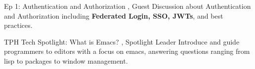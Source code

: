 

\begin{cventries}


  \cventrynoposition
    {Ep 1: Authentication and Authorization} %
    {, Guest}
    {}
    {Discussion about Authentication and Authorization including \textbf{Federated Login, SSO, JWTs}, and best practices.}

\cventrynoposition
    {TPH Tech Spotlight: What is Emacs?} %
    {, Spotlight Leader}
    {}
    {Introduce and guide programmers to editors with a focus on emacs, answering questions ranging from lisp to packages to window management.}



\end{cventries}
